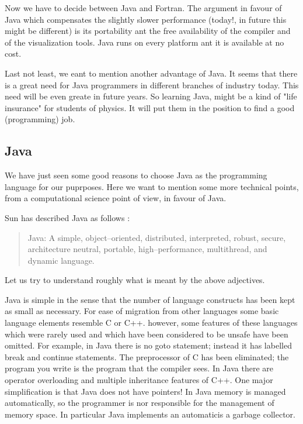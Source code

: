 Now we have to decide between Java and Fortran. The argument in favour of 
Java which compensates the slightly slower performance (today!, in future 
this might be different) is its portability ant the free availability of the
compiler and of the visualization tools. Java runs on every platform ant 
it is available at no cost. 

Last not least, we eant to mention another advantage of Java. It seems
\cite[]{bigbucks} that there is  a great need for Java programmers in 
different branches of industry today. This need will be even greate in future 
years. So learning Java, might be a kind of "life insurance" for students of 
physics. It will put them in the position to find a good (programming) job.


\subsection{Java}
\label{sec:Java}

We have just seen some good reasons to choose Java as the programming language
for our puprposes. Here we want to mention some more technical points, from a 
computational science point of view, in favour of Java.

Sun has described Java as follows \cite[]{javanutshell}:
\begin{quote}
Java: A simple, object--oriented, distributed, interpreted, robust, secure,
architecture neutral, portable, high--performance, multithread, and dynamic 
language.
\end{quote}

Let us try to understand roughly what is meant by the above adjectives.

Java is simple in the sense that the number of language constructs has been 
kept as small as necessary. For ease of migration from other languages some
basic language elements resemble C or C++. however, some features of these 
languages which were rarely used and which have been considered to be unsafe 
have been omitted. For example, in Java there is no goto statement; instead 
it has labelled break and continue statements. The preprocessor of C has been 
eliminated; the program you write is the program that the compiler sees. In 
Java there are operator overloading and multiple inheritance features of C++.
One major simplification is that Java does not have pointers!
In Java memory is managed automatically, so the programmer is nor responsible 
for the management  of memory space. In particular Java implements an 
automaticis a garbage collector.

